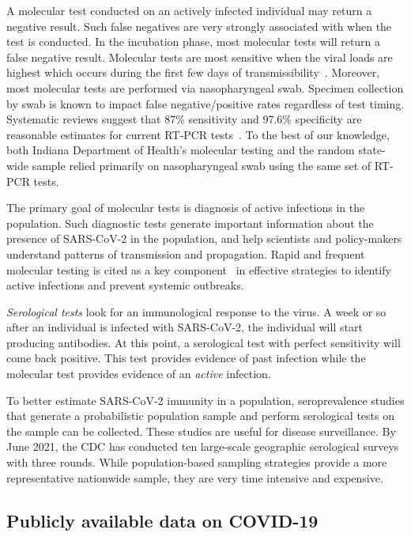 \documentclass[11pt]{amsart}
\numberwithin{equation}{section}
\theoremstyle{plain}
\begin{document}
 A molecular test conducted on an actively infected individual may return a negative result.  Such false negatives are very strongly associated with when the test is conducted.  In the incubation phase, most molecular tests will return a false negative result.  Molecular tests are most sensitive when the viral loads are highest which occurs during the first few days of transmissibility~\citep{Mina2020}.   Moreover, most molecular tests are performed via nasopharyngeal swab.  Specimen collection by swab is known to impact false negative/positive rates regardless of test timing.   Systematic reviews suggest that 87\% sensitivity and 97.6\% specificity are reasonable estimates for current RT-PCR tests~\citep{Arevalo2020, Woloshin2020,Cohen2020}.  To the best of our knowledge, both Indiana Department of Health's molecular testing and the random state-wide sample relied primarily on nasopharyngeal swab using the same set of RT-PCR tests.

 The primary goal of molecular tests is diagnosis of active infections in the population.  Such diagnostic tests generate important information about the presence of SARS-CoV-2 in the population, and help scientists and policy-makers understand patterns of transmission and propagation. Rapid and frequent molecular testing is cited as a key component~\citep{OECD2021} in effective strategies to identify active infections and prevent systemic outbreaks.


\emph{Serological tests} look for an immunological response to the virus.  A week or so after an individual is infected with SARS-CoV-2, the individual will start producing antibodies.  At this point, a serological test with perfect sensitivity will come back positive.  This test provides evidence of past infection while the molecular test provides evidence of an \emph{active} infection.

To better estimate SARS-CoV-2 immunity in a population, seroprevalence studies that generate a probabilistic population sample and perform serological tests on the sample can be collected.  These studies are useful for disease surveillance. By June 2021, the CDC has conducted ten large-scale geographic serological surveys with three rounds.  While population-based sampling strategies provide a more representative nationwide sample, they are very time intensive and expensive.

 \subsection{Publicly available data on COVID-19}
 \label{subsection:testinginfo}
\end{document}
